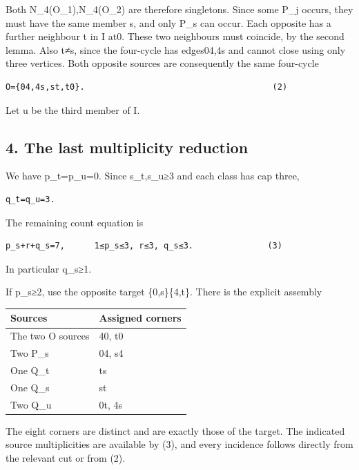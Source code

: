 \documentclass[
  10pt,
]{article}
\begin{document}
Both N\_4(O\_1),N\_4(O\_2) are therefore singletons. Since some P\_j
occurs, they must have the same member s, and only P\_s can occur. Each
opposite has a further neighbour t in I at0. These two neighbours must
coincide, by the second lemma. Also t≠s, since the four-cycle has
edges04,4s and cannot close using only three vertices. Both opposite
sources are consequently the same four-cycle

\begin{verbatim}
O={04,4s,st,t0}.                                      (2)
\end{verbatim}

Let u be the third member of I.

\hypertarget{the-last-multiplicity-reduction}{%
\subsection*{4. The last multiplicity
reduction}\label{the-last-multiplicity-reduction}}

We have p\_t=p\_u=0. Since s\_t,s\_u≥3 and each class has cap three,

\begin{verbatim}
q_t=q_u=3.
\end{verbatim}

The remaining count equation is

\begin{verbatim}
p_s+r+q_s=7,      1≤p_s≤3, r≤3, q_s≤3.               (3)
\end{verbatim}

In particular q\_s≥1.

If p\_s≥2, use the opposite target \{0,s\}\textbar\{4,t\}. There is the
explicit assembly

\begin{longtable}[]{@{}ll@{}}
\toprule\noalign{}
Sources & Assigned corners \\
\midrule\noalign{}
\endhead
\bottomrule\noalign{}
\endlastfoot
The two O sources & 40, t0 \\
Two P\_s & 04, s4 \\
One Q\_t & ts \\
One Q\_s & st \\
Two Q\_u & 0t, 4s \\
\end{longtable}

The eight corners are distinct and are exactly those of the target. The
indicated source multiplicities are available by (3), and every
incidence follows directly from the relevant cut or from (2).
\end{document}
